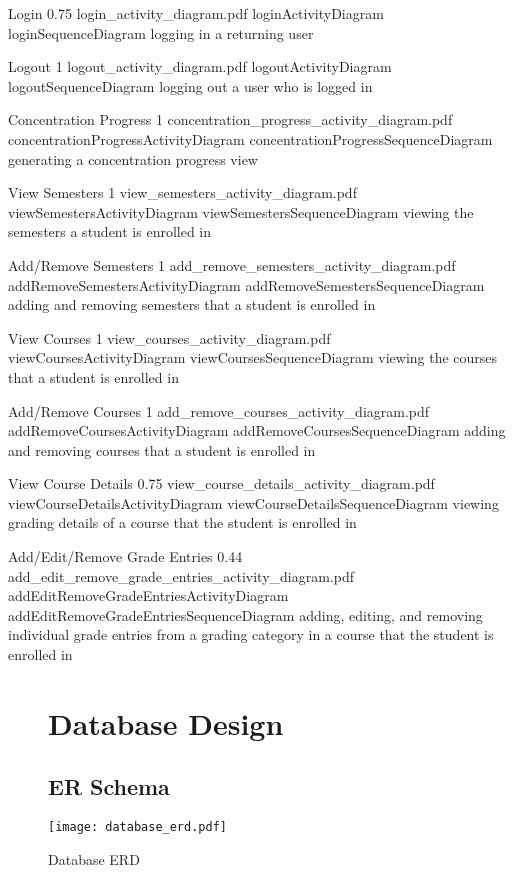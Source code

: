 \documentclass[12pt]{article}
\begin{document}
\actdia
  {Login}
  {0.75}
  {login_activity_diagram.pdf}
  {loginActivityDiagram}
  {loginSequenceDiagram}
  {logging in a returning user}

\actdia
  {Logout}
  {1}
  {logout_activity_diagram.pdf}
  {logoutActivityDiagram}
  {logoutSequenceDiagram}
  {logging out a user who is logged in}

\actdia
  {Concentration Progress}
  {1}
  {concentration_progress_activity_diagram.pdf}
  {concentrationProgressActivityDiagram}
  {concentrationProgressSequenceDiagram}
  {generating a concentration progress view}

\actdia
  {View Semesters}
  {1}
  {view_semesters_activity_diagram.pdf}
  {viewSemestersActivityDiagram}
  {viewSemestersSequenceDiagram}
  {viewing the semesters a student is enrolled in}

\actdia
  {Add/Remove Semesters}
  {1}
  {add_remove_semesters_activity_diagram.pdf}
  {addRemoveSemestersActivityDiagram}
  {addRemoveSemestersSequenceDiagram}
  {adding and removing semesters that a student is enrolled in}

\actdia
  {View Courses}
  {1}
  {view_courses_activity_diagram.pdf}
  {viewCoursesActivityDiagram}
  {viewCoursesSequenceDiagram}
  {viewing the courses that a student is enrolled in}

\actdia
  {Add/Remove Courses}
  {1}
  {add_remove_courses_activity_diagram.pdf}
  {addRemoveCoursesActivityDiagram}
  {addRemoveCoursesSequenceDiagram}
  {adding and removing courses that a student is enrolled in}

\actdia
  {View Course Details}
  {0.75}
  {view_course_details_activity_diagram.pdf}
  {viewCourseDetailsActivityDiagram}
  {viewCourseDetailsSequenceDiagram}
  {viewing grading details of a course that the student is enrolled in}

\actdia
  {Add/Edit/Remove Grade Entries}
  {0.44}
  {add_edit_remove_grade_entries_activity_diagram.pdf}
  {addEditRemoveGradeEntriesActivityDiagram}
  {addEditRemoveGradeEntriesSequenceDiagram}
  {adding, editing, and removing individual grade entries from a grading category in a course
  that the student is enrolled in}

\begin{figure}[p!]
  \section{Database Design}
  \subsection{ER Schema}
  \centering
  \texttt{[image: database\_erd.pdf]}
  \caption{Database ERD}
\end{figure}
\end{document}
